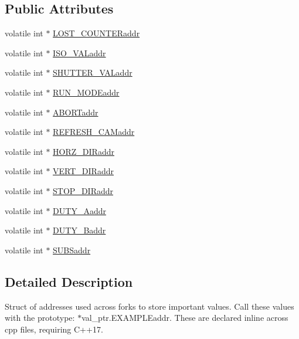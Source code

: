 \subsection*{Public Attributes}
\begin{DoxyCompactItemize}
\item 
volatile int $\ast$ \hyperlink{structval__addresses_a0eb119cb562c1ab4a3d68e513d439fcd}{L\+O\+S\+T\+\_\+\+C\+O\+U\+N\+T\+E\+Raddr}
\item 
volatile int $\ast$ \hyperlink{structval__addresses_a5a5f6d9a976602675639458fa735c845}{I\+S\+O\+\_\+\+V\+A\+Laddr}
\item 
volatile int $\ast$ \hyperlink{structval__addresses_a57ee2cd54ae492b38aae06975b64b0e2}{S\+H\+U\+T\+T\+E\+R\+\_\+\+V\+A\+Laddr}
\item 
volatile int $\ast$ \hyperlink{structval__addresses_aae5779146fa4fb188bb9572c20d5da4a}{R\+U\+N\+\_\+\+M\+O\+D\+Eaddr}
\item 
volatile int $\ast$ \hyperlink{structval__addresses_a0fe118a58a06a6f24181c13f97962e26}{A\+B\+O\+R\+Taddr}
\item 
volatile int $\ast$ \hyperlink{structval__addresses_a9da32da59ec29598d672ad09003491fd}{R\+E\+F\+R\+E\+S\+H\+\_\+\+C\+A\+Maddr}
\item 
volatile int $\ast$ \hyperlink{structval__addresses_aaa663924337345adb7b14897d1e7d1a5}{H\+O\+R\+Z\+\_\+\+D\+I\+Raddr}
\item 
volatile int $\ast$ \hyperlink{structval__addresses_a0bc3ea6915b32a17b4c333b865c81ea9}{V\+E\+R\+T\+\_\+\+D\+I\+Raddr}
\item 
volatile int $\ast$ \hyperlink{structval__addresses_ae9ae522d433f333dbb15a1ed5ebe70e6}{S\+T\+O\+P\+\_\+\+D\+I\+Raddr}
\item 
volatile int $\ast$ \hyperlink{structval__addresses_aadc43e056f0b10d3c772bd0ed45ae5bc}{D\+U\+T\+Y\+\_\+\+Aaddr}
\item 
volatile int $\ast$ \hyperlink{structval__addresses_a3bb48724a49aba39d68249e4714f731c}{D\+U\+T\+Y\+\_\+\+Baddr}
\item 
volatile int $\ast$ \hyperlink{structval__addresses_a2dc7beaca139f55cee0def0170611e03}{S\+U\+B\+Saddr}
\end{DoxyCompactItemize}


\subsection{Detailed Description}
Struct of addresses used across forks to store important values. Call these values with the prototype\+: $\ast$val\+\_\+ptr.E\+X\+A\+M\+P\+L\+Eaddr. These are declared inline across cpp files, requiring C++17. 

